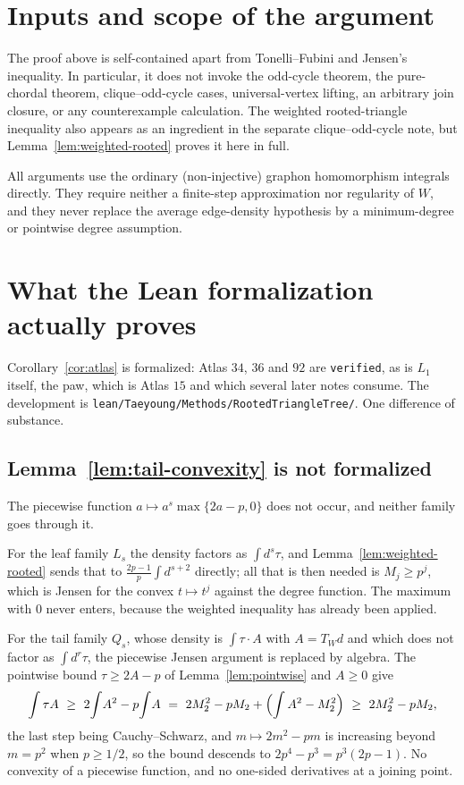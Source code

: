 \documentclass[11pt]{article}
\begin{document}
\section{Inputs and scope of the argument}

The proof above is self-contained apart from Tonelli--Fubini and Jensen's
inequality.  In particular, it does not invoke the odd-cycle theorem, the
pure-chordal theorem, clique--odd-cycle cases, universal-vertex lifting, an
arbitrary join closure, or any counterexample calculation.  The weighted
rooted-triangle inequality also appears as an ingredient in the separate
clique--odd-cycle note, but Lemma~\ref{lem:weighted-rooted} proves it here
in full.

All arguments use the ordinary (non-injective) graphon homomorphism
integrals directly.  They require neither a finite-step approximation nor
regularity of $W$, and they never replace the average edge-density
hypothesis by a minimum-degree or pointwise degree assumption.

\appendix
\section{What the Lean formalization actually proves}

Corollary~\ref{cor:atlas} is formalized: Atlas $34$, $36$ and $92$ are
\texttt{verified}, as is $L_1$ itself, the paw, which is Atlas $15$ and which
several later notes consume.  The development is
\texttt{lean/Taeyoung/Methods/RootedTriangleTree/}.  One difference of
substance.

\subsection*{Lemma~\ref{lem:tail-convexity} is not formalized}

The piecewise function $a\mapsto a^s\max\{2a-p,0\}$ does not occur, and neither
family goes through it.

For the leaf family $L_s$ the density factors as $\int d^s\tau$, and
Lemma~\ref{lem:weighted-rooted} sends that to $\frac{2p-1}{p}\int d^{s+2}$
directly; all that is then needed is $M_j\geq p^j$, which is Jensen for the
convex $t\mapsto t^j$ against the degree function.  The maximum with $0$ never
enters, because the weighted inequality has already been applied.

For the tail family $Q_s$, whose density is $\int\tau\cdot A$ with $A=T_Wd$ and
which does not factor as $\int d^r\tau$, the piecewise Jensen argument is
replaced by algebra.  The pointwise bound $\tau\geq2A-p$ of
Lemma~\ref{lem:pointwise} and $A\geq0$ give
\[
 \int\tau A\ \geq\ 2\!\int\!A^2-p\!\int\!A
 \ =\ 2M_2^2-pM_2+\Bigl(\int A^2-M_2^2\Bigr)
 \ \geq\ 2M_2^2-pM_2 ,
\]
the last step being Cauchy--Schwarz, and $m\mapsto2m^2-pm$ is increasing beyond
$m=p^2$ when $p\geq1/2$, so the bound descends to $2p^4-p^3=p^3(2p-1)$.  No
convexity of a piecewise function, and no one-sided derivatives at a joining
point.
\end{document}

